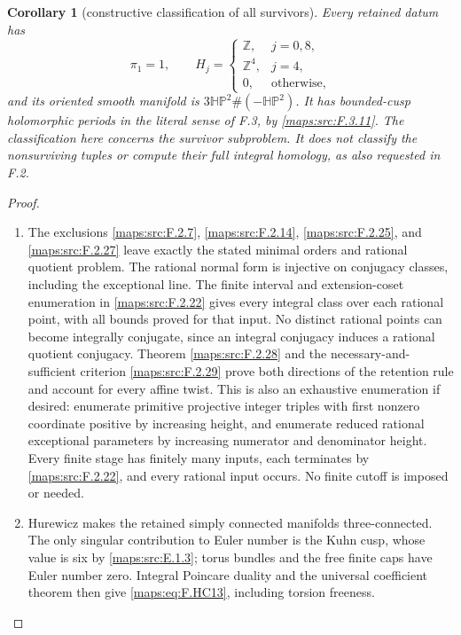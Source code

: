\documentclass[11pt,a4paper]{article}
\newtheorem{corollary}[corollary]{Corollary}
\theoremstyle{definition}
\begin{document}
\begin{corollary}[constructive classification of all survivors]
Every retained datum has
\[
 \pi_1=1,\qquad
 H_j=\begin{cases}
  \mathbb Z,&j=0,8,\\
  \mathbb Z^4,&j=4,\\
  0,&\text{otherwise},
 \end{cases}
 \tag{F.HC13}\label{maps:eq:F.HC13}
\]
and its oriented smooth manifold is
$3\mathbb{HP}^2\#(-\mathbb{HP}^2)$.
It has bounded-cusp holomorphic periods in the literal
sense of F.3, by \ref{maps:src:F.3.11}.
The classification here concerns the survivor subproblem.
It does not classify the nonsurviving tuples or compute
their full integral homology, as also requested in F.2.

\end{corollary}


\begin{proof}
\begin{enumerate}[label=\arabic*.]
\item The exclusions \ref{maps:src:F.2.7}, \ref{maps:src:F.2.14}, \ref{maps:src:F.2.25}, and \ref{maps:src:F.2.27}
leave exactly the stated minimal orders and rational
quotient problem.
The rational normal form is injective on conjugacy
classes, including the exceptional line.
The finite interval and extension-coset enumeration
in \ref{maps:src:F.2.22} gives every integral class over each rational
point, with all bounds proved for that input.
No distinct rational points can become integrally
conjugate, since an integral conjugacy induces a
rational quotient conjugacy.
Theorem \ref{maps:src:F.2.28} and the necessary-and-sufficient
criterion \ref{maps:src:F.2.29} prove both directions of the
retention rule and account for every affine twist.
This is also an exhaustive enumeration if desired:
enumerate primitive projective integer triples with
first nonzero coordinate positive by increasing height,
and enumerate reduced rational exceptional parameters
by increasing numerator and denominator height.
Every finite stage has finitely many inputs, each
terminates by \ref{maps:src:F.2.22}, and every rational input occurs.
No finite cutoff is imposed or needed.

\item Hurewicz makes the retained simply connected manifolds
three-connected.  The only singular contribution to
Euler number is the Kuhn cusp, whose value is six
by \ref{maps:src:E.1.3}; torus bundles and the free finite caps have
Euler number zero.
Integral Poincare duality and the universal coefficient
theorem then give \eqref{maps:eq:F.HC13}, including torsion freeness.


\end{enumerate}
\end{proof}
\end{document}
